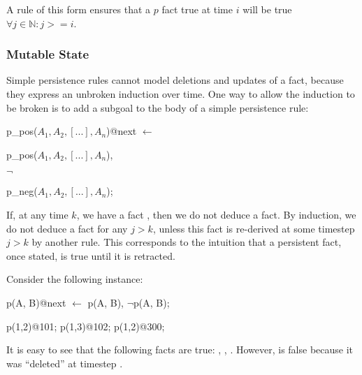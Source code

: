 
\noindent A rule of this form ensures that a $p$ fact true at time $i$ will be
true $\forall j \in \mathbb{N} : j >= i$.


\subsubsection{Mutable State}
\label{sec:mutable}

Simple persistence rules cannot model deletions and updates of a fact, because
they express an unbroken induction over time.  One way to allow the induction
to be broken is to add a  subgoal to the body of a simple
persistence rule:

\begin{dedalus}
p\_pos($A_1,A_2,[...],A_n$)@next $\leftarrow$
\end{dedalus}

\hspace{5mm}
\begin{dedalus}
p\_pos($A_1,A_2,[...],A_n$),
\end{dedalus}

\hspace{5mm}
$\lnot$
\begin{dedalus}
p\_neg($A_1,A_2,[...],A_n$);
\end{dedalus}

\noindent If, at any time $k$, we have a fact
, then we do not deduce a
 fact.  By induction, we do not deduce a
 fact for any $j > k$, unless this
 fact is re-derived at some timestep $j > k$ by another rule.
This corresponds to the intuition that a persistent fact, once stated, is true
until it is retracted.

\begin{example}
Consider the following \lang instance:

\begin{Dedalus}
p\pos(A, B)@next \(\leftarrow\) p\pos(A, B), \(\lnot\)p\nega(A, B);

p(1,2)@101;
p(1,3)@102;
p\nega(1,2)@300;
\end{Dedalus}

It is easy to see that the following facts are true: ,
, .  However,  is
false because it was ``deleted'' at timestep .
\end{example}


